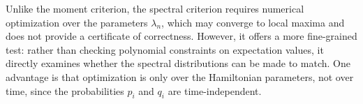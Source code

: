 \documentclass[aps,prx,reprint,superscriptaddress,footnote, twocolumn,notitlepage]{revtex4-2}
\newcommand{\ko}[1]{\textcolor{orange}{#1}}
\begin{document}
Unlike the moment criterion, the spectral criterion requires numerical optimization over the parameters $\lambda_n$, which may converge to local maxima and does not provide a certificate of correctness. However, it offers a more fine-grained test: rather than checking polynomial constraints on expectation values, it directly examines whether the spectral distributions can be made to match. One advantage is that optimization is only over the Hamiltonian parameters, not over time, since the probabilities $p_i$ and $q_i$ are time-independent.

\end{document}
